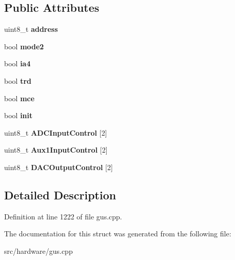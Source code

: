 \subsection*{Public Attributes}
\begin{DoxyCompactItemize}
\item 
\hypertarget{structgus__cs4231_a854196e166728ab338bd4dc1825e5376}{uint8\-\_\-t {\bfseries address}}\label{structgus__cs4231_a854196e166728ab338bd4dc1825e5376}

\item 
\hypertarget{structgus__cs4231_a1a0f1c8241e22df8912de936d6dd36a2}{bool {\bfseries mode2}}\label{structgus__cs4231_a1a0f1c8241e22df8912de936d6dd36a2}

\item 
\hypertarget{structgus__cs4231_ac856e0ff138f97283412af3a660ae48f}{bool {\bfseries ia4}}\label{structgus__cs4231_ac856e0ff138f97283412af3a660ae48f}

\item 
\hypertarget{structgus__cs4231_a98abeed198155481a7acbf4816affc16}{bool {\bfseries trd}}\label{structgus__cs4231_a98abeed198155481a7acbf4816affc16}

\item 
\hypertarget{structgus__cs4231_a6fc11df0fe6de72eaac011a4eaeb506e}{bool {\bfseries mce}}\label{structgus__cs4231_a6fc11df0fe6de72eaac011a4eaeb506e}

\item 
\hypertarget{structgus__cs4231_a1e1427d7fdd2d24972074cd552ea1e1f}{bool {\bfseries init}}\label{structgus__cs4231_a1e1427d7fdd2d24972074cd552ea1e1f}

\item 
\hypertarget{structgus__cs4231_a555b8f8e51d7a01912a32d399e50e264}{uint8\-\_\-t {\bfseries A\-D\-C\-Input\-Control} \mbox{[}2\mbox{]}}\label{structgus__cs4231_a555b8f8e51d7a01912a32d399e50e264}

\item 
\hypertarget{structgus__cs4231_ac5339efcc287958ad556d9fc7a590876}{uint8\-\_\-t {\bfseries Aux1\-Input\-Control} \mbox{[}2\mbox{]}}\label{structgus__cs4231_ac5339efcc287958ad556d9fc7a590876}

\item 
\hypertarget{structgus__cs4231_aecf705a077583ef50851864d5dd7ef53}{uint8\-\_\-t {\bfseries D\-A\-C\-Output\-Control} \mbox{[}2\mbox{]}}\label{structgus__cs4231_aecf705a077583ef50851864d5dd7ef53}

\end{DoxyCompactItemize}


\subsection{Detailed Description}


Definition at line 1222 of file gus.\-cpp.



The documentation for this struct was generated from the following file\-:\begin{DoxyCompactItemize}
\item 
src/hardware/gus.\-cpp\end{DoxyCompactItemize}
